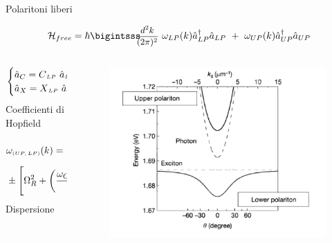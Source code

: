 \documentclass[10pt]{beamer}
\begin{document}
\begin{frame}{Polaritoni liberi}

\begin{equation*}
 \ham_{free} = \hbar \intk \omega_{LP} (k) \oa_{LP}^\dagger \oa_{LP} ~ + ~ \omega_{UP} (k) \oa_{UP}^\dagger \oa_{UP}
\end{equation*}

\begin{minipage}{\textwidth}
\begin{columns}
\footnotesize{
  \begin{column}{.4\textwidth}
  
   $$\begin{cases}
	\hat{a}_C = C{\scriptstyle _{LP}} \ \hat{a}{\scriptstyle _{LP}} + C{\scriptstyle _{UP}} \ \hat{a}{\scriptstyle _{UP}} \\
	\hat{a}_X = X{\scriptstyle _{LP}} \ \hat{a}{\scriptstyle _{LP}} + X{\scriptstyle _{UP}} \ \hat{a}{\scriptstyle _{UP}}
     \end{cases}
   $$
   Coefficienti di Hopfield

   \begin{equation*}
    \begin{align}
      &\omega_{\text{\tiny{$(UP,LP)$}}} (k) = \frac{\omega_C (k) + \omega_X (k)}{2} \\
			     &\pm \left[\Omega_R^2 + \left(\frac{\omega_C (k) - \omega_X (k)}{2}\right)^2\right]^{1/2}
    \end{align}
   \end{equation*}
   Dispersione
  
  \end{column}
  }
  \hspace{.5cm}
  \begin{column}{.55\textwidth}
   \begin{figure}[h]
    \includegraphics[scale=.2]{files/polariton_dispersion.png}
   \end{figure}

  \end{column}
\end{columns}
\end{minipage}

\end{frame}
\end{document}
